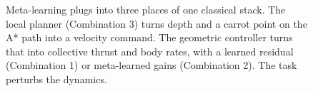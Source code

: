 \begin{figure}[t]
\centering

\caption{Meta-learning plugs into three places of one classical stack. The local planner (Combination 3) turns depth and a carrot point on the A* path into a velocity command. The geometric controller turns that into collective thrust and body rates, with a learned residual (Combination 1) or meta-learned gains (Combination 2). The task perturbs the dynamics.}
\label{fig:pipeline}
\end{figure}
